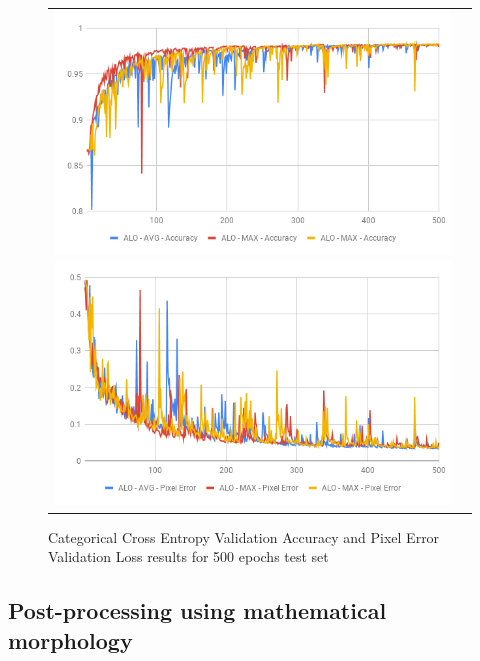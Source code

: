 
\begin{figure}
  \caption{Categorical Cross Entropy Validation Accuracy and Pixel Error Validation Loss results for 500 epochs test set}
  \centering
  \begin{tabular}{ll}
    \includegraphics[width=1.\columnwidth]{figures/falreis/val_acc_500_epochs.png}
  
    \includegraphics[width=1.\columnwidth]{figures/falreis/pixel_error_500_epochs.png}
  \end{tabular}%
  \label{fig:val_acc_500_epochs}
\end{figure}

\subsection{Post-processing using mathematical morphology}

